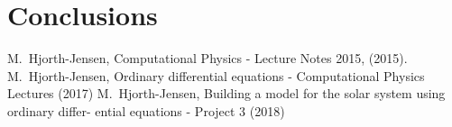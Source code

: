 \documentclass[10pt,showpacs,preprintnumbers,footinbib,amsmath,amssymb,aps,prl,twocolumn,groupedaddress,superscriptaddress,showkeys]{revtex4-1}
\begin{document}
\section{Conclusions}


\begin{thebibliography}{99}
 M.~Hjorth-Jensen, Computational Physics - Lecture Notes 2015, (2015).
 M.~Hjorth-Jensen, Ordinary differential equations - Computational Physics Lectures (2017)
 M.~Hjorth-Jensen, Building a model for the solar system using ordinary differ-
ential equations - Project 3 (2018)
\end{thebibliography}
\end{document}
